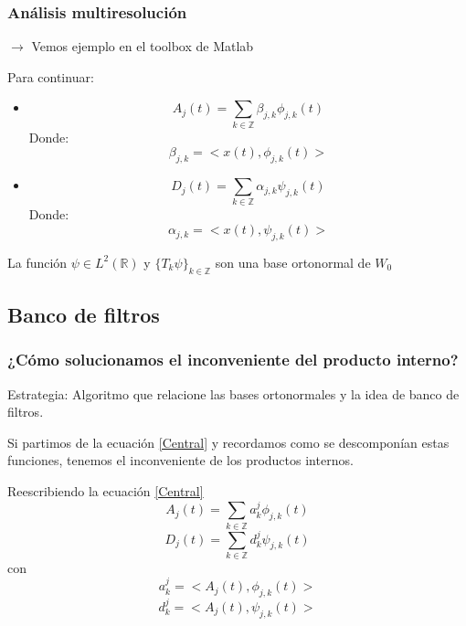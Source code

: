 \documentclass{beamer}
\begin{document}
\begin{frame}
\frametitle{Análisis multiresolución}
$\rightarrow$ Vemos ejemplo en el toolbox de Matlab
  
Para continuar:
\begin{itemize}
  \item 
  \begin{equation}
    A_j(t)=\sum_{k \in \mathbb Z} \beta _{j,k} \phi _{j,k}(t)
  \end{equation}
  Donde:
  \begin{equation}
    \label{Beta}
    \beta _{j,k}= <x(t), \phi _{j,k}(t)>
  \end{equation}

  \item
  \begin{equation}
    D_j(t)=\sum_{k \in \mathbb Z} \alpha _{j,k} \psi _{j,k}(t)
  \end{equation}
  Donde:
  \begin{equation}
    \label{Alfa}
    \alpha _{j,k}= <x(t), \psi _{j,k}(t)>
  \end{equation}
\end{itemize}
La función $\psi \in L^{2}(\mathbb{R})$ y $\{T_k \psi \}_{k \in \mathbb{Z}}$ son una base ortonormal de $W_0$
\end{frame}


\subsection{Banco de filtros}
  
  \begin{frame}
    \frametitle{¿Cómo solucionamos el inconveniente del producto interno?}
    
    Estrategia: Algoritmo que relacione las bases ortonormales y la idea de banco de filtros.
      
     Si partimos de la ecuación \ref{Central} y recordamos como se descomponían estas funciones, tenemos el inconveniente de los productos internos.
        
  \end{frame}

   \begin{frame}

Reescribiendo la ecuación \ref{Central} 
   \begin{equation}
\label{Aj}
A_j(t)=\sum_{k \in \mathbb Z}  a^{j}_{k} \phi _{j,k}(t)
\end{equation} 
\begin{equation}
\label{Dj}
D_j(t)=\sum_{k \in \mathbb Z}  d^{j}_{k} \psi _{j,k}(t)
\end{equation} 
con
\begin{equation}
\label{ajk}
a^{j}_{k}= <A_{j}(t), \phi _{j,k}(t)>
\end{equation}
\begin{equation}
\label{ajk}
d^{j}_{k}= <A_{j}(t), \psi _{j,k}(t)>
\end{equation}
    \end{frame}
    
\end{document}

